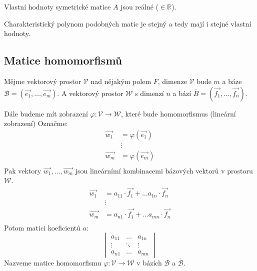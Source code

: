 \begin{theorem}
    Vlastní hodnoty symetrické matice $A$ jsou reálné ($\in \mathbb{R}$).
\end{theorem}

\begin{theorem}
    Charakteristický polynom podobných matic je stejný a tedy mají i stejné vlastní hodnoty.
\end{theorem}

\subsection{Matice homomorfismů}
\begin{definition}
    Mějme vektorový prostor $\mathcal{V}$ nad nějakým polem $F$, dimenze $\mathcal{V}$ bude
    $m$ a báze $\mathcal{B} = (\vec{e_1}, \ldots, \vec{e_m})$. A vektorový prostor $\mathcal{W}$
    s dimenzí $n$ a bází $\overline{B} = (\vec{f_1}, \ldots, \vec{f_n})$.

    Dále budeme mít zobrazení $\varphi: \mathcal{V} \rightarrow \mathcal{W}$, které bude homomorfismus
    (lineární zobrazení)
    Označme:
    \begin{align*}
        \vec{w_1} &= \varphi(\vec{e_1})\\
        &\vdots\\
        \vec{w_m} &= \varphi(\vec{e_m})\\
    \end{align*}
    Pak vektory $\vec{w_1}, \ldots, \vec{w_m}$ jsou lineárnímí kombinacemi bázových vektorů v prostoru
    $\mathcal{W}$.
    \begin{align*}
        \vec{w_1} &= a_{11} \cdot \vec{f_1} + \ldots a_{1n} \cdot \vec{f_n}\\
        &\vdots\\
        \vec{w_m} &= a_{n1} \cdot \vec{f_1} + \ldots a_{mn} \cdot \vec{f_n}\\
    \end{align*}
    Potom matici koeficientů $a$:
    \[
        \begin{vmatrix}
            a_{11} & \ldots & a_{1n} \\
            \vdots & \ddots & \vdots\\
            a_{n1} & \ldots & a_{mn}
        \end{vmatrix}
    \]
    Nazveme matice homomorfismu $\varphi: \mathcal{V} \rightarrow \mathcal{W}$ v bázích $\mathcal{B}$
    a $\overline{\mathcal{B}}$.
\end{definition}

